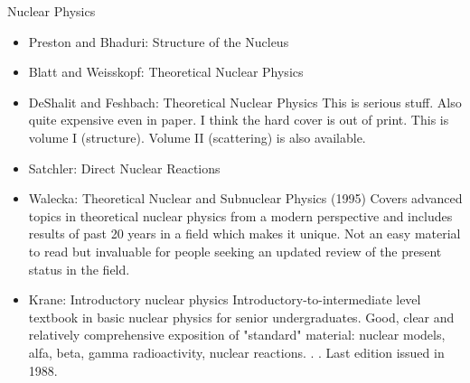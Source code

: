 \documentclass[10pt,a4paper]{book}
\theoremstyle{definition}
\begin{document}
Nuclear Physics
\begin{itemize}
\item Preston and Bhaduri: Structure of the Nucleus
\item Blatt and Weisskopf: Theoretical Nuclear Physics
\item DeShalit and Feshbach: Theoretical Nuclear Physics
This is serious stuff.  Also quite expensive even in paper.  I think the hard cover is out of print.  This is volume I (structure).  Volume II (scattering) is also available.
\item Satchler: Direct Nuclear Reactions
\item Walecka: Theoretical Nuclear and Subnuclear Physics (1995)
Covers advanced topics in theoretical nuclear physics from a modern perspective and includes results of past 20 years in a field which makes it unique.  Not an easy material to read but invaluable for people seeking an updated review of the present status in the field.
\item Krane: Introductory nuclear physics
Introductory-to-intermediate level textbook in basic nuclear physics for senior undergraduates.  Good, clear and relatively comprehensive exposition of "standard" material: nuclear models, alfa, beta, gamma radioactivity, nuclear reactions. . .  Last edition issued in 1988.
\end{itemize}
\end{document}
